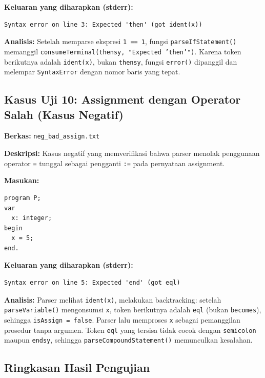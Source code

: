 \documentclass[12pt,a4paper]{article}
\begin{document}
\textbf{Keluaran yang diharapkan (stderr):}
\begin{lstlisting}[style=default]
Syntax error on line 3: Expected 'then' (got ident(x))
\end{lstlisting}

\textbf{Analisis:} Setelah memparse ekspresi \texttt{1 == 1}, fungsi \texttt{parseIfStatement()} memanggil \texttt{consumeTerminal(thensy, "Expected 'then'")}. Karena token berikutnya adalah \texttt{ident(x)}, bukan \texttt{thensy}, fungsi \texttt{error()} dipanggil dan melempar \texttt{SyntaxError} dengan nomor baris yang tepat.

\subsection{Kasus Uji 10: Assignment dengan Operator Salah (Kasus Negatif)}
\textbf{Berkas:} \texttt{neg\_bad\_assign.txt}

\textbf{Deskripsi:} Kasus negatif yang memverifikasi bahwa parser menolak penggunaan operator \texttt{=} tunggal sebagai pengganti \texttt{:=} pada pernyataan assignment.

\textbf{Masukan:}
\begin{lstlisting}[style=default]
program P;
var
  x: integer;
begin
  x = 5;
end.
\end{lstlisting}

\textbf{Keluaran yang diharapkan (stderr):}
\begin{lstlisting}[style=default]
Syntax error on line 5: Expected 'end' (got eql)
\end{lstlisting}

\textbf{Analisis:} Parser melihat \texttt{ident(x)}, melakukan backtracking: setelah \texttt{parseVariable()} mengonsumsi \texttt{x}, token berikutnya adalah \texttt{eql} (bukan \texttt{becomes}), sehingga \texttt{isAssign = false}. Parser lalu memproses \texttt{x} sebagai pemanggilan prosedur tanpa argumen. Token \texttt{eql} yang tersisa tidak cocok dengan \texttt{semicolon} maupun \texttt{endsy}, sehingga \texttt{parseCompoundStatement()} memunculkan kesalahan.

\subsection{Ringkasan Hasil Pengujian}
\end{document}
